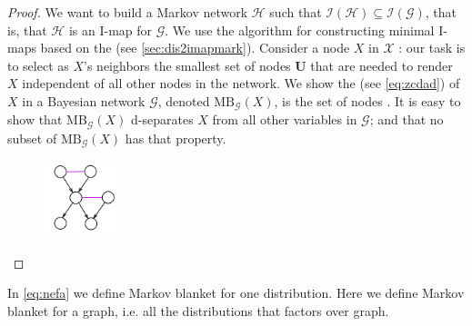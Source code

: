 \documentclass{article}
\begin{document}
\begin{proof}
We want to build a Markov network $\mathcal{H}$ such that $\mathcal{I}(\mathcal{H}) \subseteq \mathcal{I}(\mathcal{G})$, that is, that $\mathcal{H}$ is an I-map for $\mathcal{G}$. We use the algorithm for constructing minimal I-maps based on the  (see \cref{sec:dis2imapmark}). Consider a node $X$ in $\mathcal{X}$ : our task is to select as $X$'s neighbors the smallest set of nodes $\boldsymbol{U}$ that are needed to render $X$ independent of all other nodes in the network. We show the  (see \cref{eq:zcdad}) of $X$ in a Bayesian network $\mathcal{G}$, denoted $\mathrm{MB}_{\mathcal{G}}(X)$, is the set of nodes . It is easy to show that $\mathrm{MB}_{\mathcal{G}}(X)$ d-separates $X$ from all other variables in $\mathcal{G}$; and that no subset of $\mathrm{MB}_{\mathcal{G}}(X)$ has that property.
\begin{figure}[H]
    \centering
    \includegraphics[width=0.2\textwidth]{Figs/a19.png}
    \caption{}
\end{figure}
\end{proof}
\begin{rema}
In \cref{eq:nefa} we define  Markov blanket for one distribution. Here we define  Markov blanket for a graph, i.e. all the distributions that factors over graph.
\end{rema}
\end{document}
